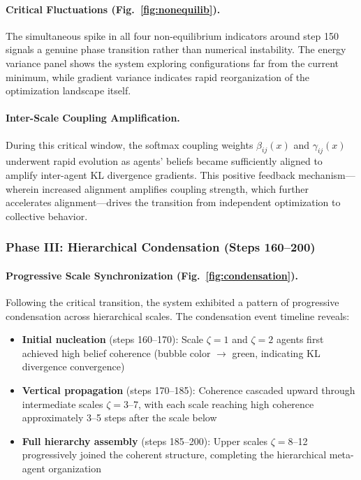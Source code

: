 \documentclass[11pt]{article}
\begin{document}
\paragraph{Critical Fluctuations (Fig.~\ref{fig:nonequilib}).}
The simultaneous spike in all four non-equilibrium indicators around step 150 signals a genuine phase transition rather than numerical instability. The energy variance panel shows the system exploring configurations far from the current minimum, while gradient variance indicates rapid reorganization of the optimization landscape itself.

\paragraph{Inter-Scale Coupling Amplification.}
During this critical window, the softmax coupling weights $\beta_{ij}(x)$ and $\gamma_{ij}(x)$ underwent rapid evolution as agents' beliefs became sufficiently aligned to amplify inter-agent KL divergence gradients. This positive feedback mechanism—wherein increased alignment amplifies coupling strength, which further accelerates alignment—drives the transition from independent optimization to collective behavior.

\subsubsection{Phase III: Hierarchical Condensation (Steps 160--200)}

\paragraph{Progressive Scale Synchronization (Fig.~\ref{fig:condensation}).}

Following the critical transition, the system exhibited a pattern of progressive condensation across hierarchical scales. The condensation event timeline reveals:

\begin{itemize}
\item \textbf{Initial nucleation} (steps 160--170): Scale $\zeta = 1$ and $\zeta = 2$ agents first achieved high belief coherence (bubble color $\to$ green, indicating KL divergence convergence)

\item \textbf{Vertical propagation} (steps 170--185): Coherence cascaded upward through intermediate scales $\zeta = 3$--7, with each scale reaching high coherence approximately 3--5 steps after the scale below

\item \textbf{Full hierarchy assembly} (steps 185--200): Upper scales $\zeta = 8$--12 progressively joined the coherent structure, completing the hierarchical meta-agent organization

\end{itemize}
\end{document}
